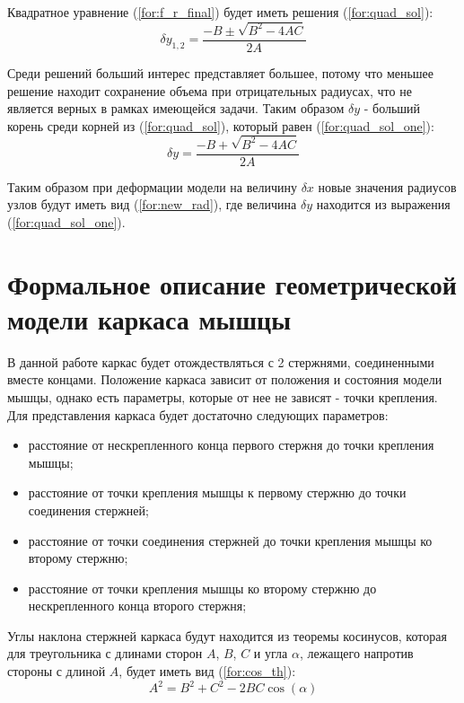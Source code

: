 Квадратное уравнение (\ref{for:f_r_final}) будет иметь решения (\ref{for:quad_sol}):
\begin{equation}
    \label{for:quad_sol}
    \delta y_{1, 2} = \frac{-B \pm \sqrt{B^2 - 4AC}}{2A}
\end{equation}

Среди решений больший интерес представляет большее, потому что меньшее решение находит сохранение объема при отрицательных радиусах, что не является верных в рамках имеющейся задачи. Таким образом $\delta y$ - больший корень среди корней из (\ref{for:quad_sol}), который равен (\ref{for:quad_sol_one}):
\begin{equation}
    \label{for:quad_sol_one}
    \delta y = \frac{-B + \sqrt{B^2 - 4AC}}{2A}
\end{equation}

Таким образом при деформации модели на величину $\delta x$ новые значения радиусов узлов будут иметь вид (\ref{for:new_rad}), где величина $\delta y$ находится из выражения (\ref{for:quad_sol_one}).

\section{Формальное описание геометрической модели каркаса мышцы}

В данной работе каркас будет отождествляться с 2 стержнями, соединенными вместе концами. Положение каркаса зависит от положения и состояния модели мышцы, однако есть параметры, которые от нее не зависят - точки крепления. Для представления каркаса будет достаточно следующих параметров:
\begin{itemize}
    \item расстояние от нескрепленного конца первого стержня до точки крепления мышцы;
    \item расстояние от точки крепления мышцы к первому стержню до точки соединения стержней;
    \item расстояние от точки соединения стержней до точки крепления мышцы ко второму стержню;
    \item расстояние от точки крепления мышцы ко второму стержню до нескрепленного конца второго стержня;
\end{itemize}

Углы наклона стержней каркаса будут находится из теоремы косинусов, которая для треугольника с длинами сторон $A$, $B$, $C$ и угла $\alpha$, лежащего напротив стороны с длиной $A$, будет иметь вид (\ref{for:cos_th}):
\begin{equation}
    \label{for:cos_th}
    A^2 = B^2 + C^2 - 2BC \cos(\alpha)
\end{equation}

